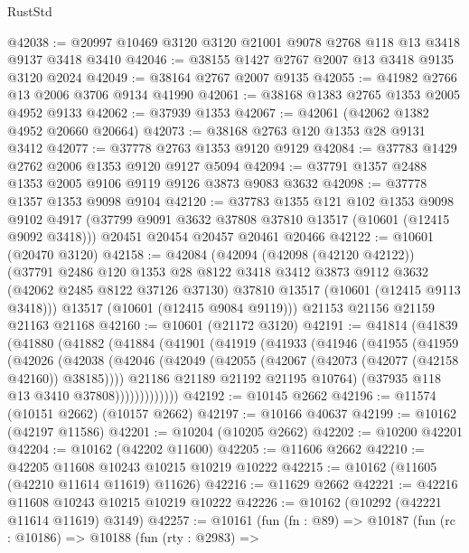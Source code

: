 \begin{lexlean}{RustStd}
\begin{coremodule}
@42038 := @20997 @10469 @3120 @3120 @21001 @9078 @2768 @118 @13 @3418 @9137 @3418 @3410
@42046 := @38155 @1427 @2767 @2007 @13 @3418 @9135 @3120 @2024
@42049 := @38164 @2767 @2007 @9135
@42055 := @41982 @2766 @13 @2006 @3706 @9134 @41990
@42061 := @38168 @1383 @2765 @1353 @2005 @4952 @9133
@42062 := @37939 @1353
@42067 := @42061 (@42062 @1382 @4952 @20660 @20664)
@42073 := @38168 @2763 @120 @1353 @28 @9131 @3412
@42077 := @37778 @2763 @1353 @9120 @9129
@42084 := @37783 @1429 @2762 @2006 @1353 @9120 @9127 @5094
@42094 := @37791 @1357 @2488 @1353 @2005 @9106 @9119 @9126 @3873 @9083 @3632
@42098 := @37778 @1357 @1353 @9098 @9104
@42120 := @37783
    @1355
    @121
    @102
    @1353
    @9098
    @9102
    @4917
    (@37799 @9091 @3632 @37808 @37810 @13517 (@10601 (@12415 @9092 @3418)))
    @20451
    @20454
    @20457
    @20461
    @20466
@42122 := @10601 (@20470 @3120)
@42158 := @42084
    (@42094
      (@42098 (@42120 @42122))
      (@37791
        @2486
        @120
        @1353
        @28
        @8122
        @3418
        @3412
        @3873
        @9112
        @3632
        (@42062 @2485 @8122 @37126 @37130)
        @37810
        @13517
        (@10601 (@12415 @9113 @3418)))
      @13517
      (@10601 (@12415 @9084 @9119)))
    @21153
    @21156
    @21159
    @21163
    @21168
@42160 := @10601 (@21172 @3120)
@42191 := @41814
    (@41839
      (@41880
        (@41882
          (@41884
            (@41901
              (@41919
                (@41933
                  (@41946
                    (@41955
                      (@41959
                        (@42026
                          (@42038
                            (@42046
                              (@42049 (@42055 (@42067 (@42073 (@42077 (@42158 @42160)) @38185))))
                              @21186
                              @21189
                              @21192
                              @21195
                              @10764)
                            (@37935 @118 @13 @3410 @37808)))))))))))))
@42192 := @10145 @2662
@42196 := @11574 (@10151 @2662) (@10157 @2662)
@42197 := @10166 @40637
@42199 := @10162 (@42197 @11586)
@42201 := @10204 (@10205 @2662)
@42202 := @10200 @42201
@42204 := @10162 (@42202 @11600)
@42205 := @11606 @2662
@42210 := @42205 @11608 @10243 @10215 @10219 @10222
@42215 := @10162 (@11605 (@42210 @11614 @11619) @11626)
@42216 := @11629 @2662
@42221 := @42216 @11608 @10243 @10215 @10219 @10222
@42226 := @10162 (@10292 (@42221 @11614 @11619) @3149)
@42257 := @10161
    (fun (fn : @89) =>
    @10187
      (fun (rc : @10186) =>
      @10188
        (fun (rty : @2983) =>

\end{coremodule}
\end{lexlean}
